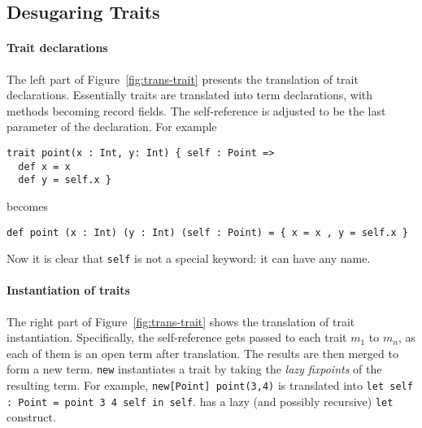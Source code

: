 \subsection{Desugaring Traits}

\paragraph{Trait declarations}

The left part of Figure~\ref{fig:trans-trait} presents the translation of trait
declarations. Essentially traits are translated into term declarations, with
methods becoming record fields. The self-reference is adjusted to be the last
parameter of the declaration. For example
\begin{lstlisting}
trait point(x : Int, y: Int) { self : Point =>
  def x = x
  def y = self.x }
\end{lstlisting}
becomes
\begin{lstlisting}
def point (x : Int) (y : Int) (self : Point) = { x = x , y = self.x }
\end{lstlisting}
Now it is clear that \lstinline{self} is not a special keyword: it can have any
name.



\paragraph{Instantiation of traits}

The right part of Figure~\ref{fig:trans-trait} shows the translation of trait
instantiation. Specifically, the self-reference gets passed to each trait $m_1$
to $m_n$, as each of them is an open term after translation. The results are
then merged to form a new term. \lstinline{new} instantiates a trait by
taking the \textit{lazy fixpoints} of the resulting term. For example,
\lstinline{new[Point] point(3,4)} is translated into \lstinline{let self : Point = point 3 4 self in self}.
\name has a lazy (and possibly recursive) \lstinline{let} construct.




